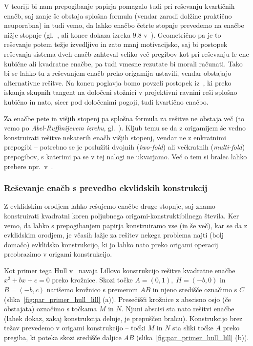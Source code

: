 V teoriji bi nam prepogibanje papirja pomagalo tudi pri reševanju kvartičnih enačb, saj zanje še obstaja splošna formula (vendar zaradi dolžine praktično neuporabna) in tudi vemo, da lahko enačbo četrte stopnje prevedemo na enačbe nižje stopnje (gl.\ \cite{quartics2012}, \cite{wikiquartic} ali konec dokaza izreka $9.8$ v~\cite[str.\ 134]{geometricconstructions}). Geometrično pa je to reševanje potem težje izvedljivo in zato manj motivacijsko, saj bi postopek reševanja sistema dveh enačb zahteval veliko več pregibov kot pri reševanju le ene kubične ali kvadratne enačbe, pa tudi vmesne rezutate bi morali računati. Tako bi se lahko tu z reševanjem enačb preko origamija ustavili, vendar obstajajo alternativne rešitve. Na koncu poglavja bomo povzeli postopek iz~\cite{edwards2001}, ki preko iskanja skupnih tangent na določeni stožnici v projektivni ravnini reši splošno kubično in nato, sicer pod določenimi pogoji, tudi kvartično enačbo.

Za enačbe pete in višjih stopenj pa splošna formula za rešitve ne obstaja več (to vemo po \emph{Abel-Ruffinijevem izreku}, gl.\ \cite{mrinal2019}). Kljub temu se da z origamijem še vedno konstruirati rešitve nekaterih enačb višjih stopenj, vendar ne z enkratnimi prepogibi -- potrebno se je poslužiti dvojnih (\emph{two-fold}) ali večkratnih (\emph{multi-fold}) prepogibov, s katerimi pa se v tej nalogi ne ukvarjamo. Več o tem si bralec lahko prebere npr.\ v~\cite{langalperin2009}.

\subsubsection*{Reševanje enačb s prevedbo ekvlidskih konstrukcij}

Z evklidskim orodjem lahko rešujemo enačbe druge stopnje, saj znamo konstruirati kvadratni koren poljubnega origami-konstruktibilnega števila. Ker vemo, da lahko s prepogibanjem papirja konstruiramo vse (in še več), kar se da z evklidskim orodjem, je včasih lažje za rešitev nekega problema najti (bolj domačo) evklidsko konstrukcijo, ki jo lahko nato preko origami operacij preobrazimo v origami konstrukcijo.

Kot primer tega Hull v~\cite[str.\ 38]{hull2020} navaja Lillovo konstrukcijo rešitve kvadratne enačbe $x^2 + bx + c = 0$ preko krožnice. Skozi točke $A = (0,1), \; H = (-b, 0)$ in $B = (-b, c)$ narišemo krožnico s premerom $AB$ in njeno središče označimo s $C$ (slika~\ref{fig:par_primer_hull_lill} (a)). Presečišči krožnice z abscisno osjo (če obstajata) označimo s točkama $M$ in $N$. Njuni abscisi sta nato rešitvi enačbe (lahek dokaz, zakaj konstrukcija deluje, je prepuščen bralcu). Konstrukcijo brez težav prevedemo v origami konstrukcijo -- točki $M$ in $N$ sta sliki točke $A$ preko pregiba, ki poteka skozi središče daljice $AB$ (slika~\ref{fig:par_primer_hull_lill} (b)).

